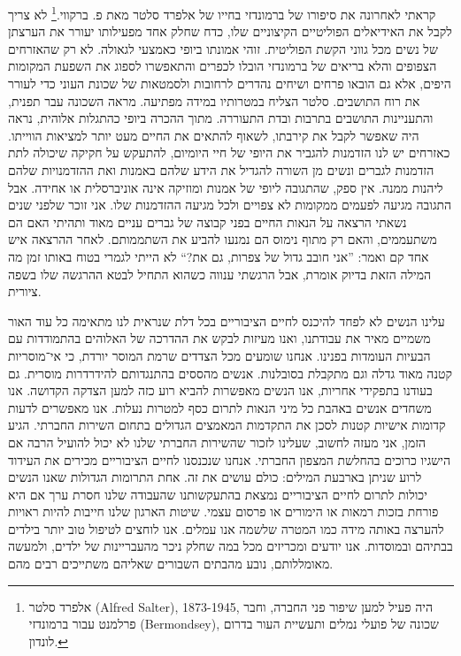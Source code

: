 \documentclass[12pt, extrafontsizes, twopage, a5paper]{memoir}
\begin{document}
קראתי לאחרונה את סיפורו של ברמונדזי בחייו של אלפרד סלטר מאת פ. ברקווי.\footnote{אלפרד סלטר (\textenglish{Alfred Salter}), 1873-1945, היה פעיל למען שיפור פני החברה, וחבר פרלמנט עבור ברמונדזי (\textenglish{Bermondsey}), שכונה של פועלי נמלים ותעשיית העור בדרום לונדון.} לא צריך לקבל את האידיאלים הפוליטיים הקיצוניים שלו, כדח שחלק אחד מפעילותו יעורר את הערצתן של נשים מכל גווני הקשת הפוליטית. זוהי אמונתו ביופי כאמצעי לגאולה. לא רק שהאזרחים הצפופים והלא בריאים של ברמונדזי הובלו לכפרים והתאפשרו לספוג את השפעת המקומות היפים, אלא גם הובאו פרחים ושיחים נהדרים לרחובות ולסמטאות של שכונת העוני כדי לעורר את רוח התושבים. סלטר הצליח במטרותיו במידה מפתיעה. מראה השכונה עבר תפנית, והתעניינות התושבים בתרבות ובדת התעוררה. מתוך ההכרה ביופי כהתגלות אלוהית, נראה היה שאפשר לקבל את קירבתו, לשאוף להתאים את החיים מעט יותר למציאות הווייתו. כאזרחים יש לנו הזדמנות להגביר את היופי של חיי היומיום, להתעקש על חקיקה שיכולה לתת הזדמנות לגברים ונשים מן השורה להגדיל את הידע שלהם באמנות ואת ההזדמנויות שלהם ליהנות ממנה. אין ספק, שהתגובה ליופי של אמנות ומוזיקה אינה אוניברסלית או אחידה. אבל התגובה מגיעה לפעמים ממקומות לא צפויים ולכל מגיעה ההזדמנות שלו. אני זוכר שלפני שנים נשאתי הרצאה על הנאות החיים בפני קבוצה של גברים עניים מאוד ותהיתי האם הם משתעממים, והאם רק מתוף נימוס הם נמנעו להביע את השתממותם. לאחר ההרצאה איש אחד קם ואמר: ”אני חובב גדול של צפרות, גם את?“ לא הייתי לגמרי בטוח באותו זמן מה המילה הזאת בדיוק אומרת, אבל הרגשתי ענווה כשהוא התחיל לבטא ההרגשה שלו בשפה ציורית.

עלינו הנשים לא לפחד להיכנס לחיים הציבוריים בכל דלת שנראית לנו מתאימה כל עוד האור משמיים מאיר את עבודתנו, ואנו מעיזות לבקש את ההדרכה של האלוהים בהתמודדות עם הבעיות העומדות בפנינו. אנחנו שומעים מכל הצדדים שרמת המוסר יורדת, כי אי־מוסריות קטנה מאוד גדלה וגם מתקבלת בסובלנות. אנשים מהססים בהתנגדותם להידרדרות מוסרית. גם בעודנו בתפקידי אחריות, אנו הנשים מאפשרות להביא רוע כזה למען הצדקה הקדושה. אנו משחדים אנשים באהבת כל מיני הנאות לתרום כסף למטרות נעלות. אנו מאפשרים לדעות קדומות אישיות קטנות לסכן את התקדמות המאמצים הגדולים בתחום השירות החברתי. הגיע הזמן, אני מעזה לחשוב, שעלינו לזכור שהשירות החברתי שלנו לא יכול להועיל הרבה אם הישגיו כרוכים בהחלשת המצפון החברתי. אנחנו שנכנסנו לחיים הציבוריים מכירים את העידוד לרוע שניתן בארבעת המילים: כולם עושים את זה. אחת התרומות הגדולות שאנו הנשים יכולות לתרום לחיים הציבוריים נמצאת בהתעקשותנו שהעבודה שלנו חסרת ערך אם היא פורחת בזכות רמאות או הימורים או פרסום עצמי. שיטות הארגון שלנו חייבות להיות ראויות להערצה באותה מידה כמו המטרה שלשמה אנו עמלים. אנו לוחצים לטיפול טוב יותר בילדים בבתיהם ובמוסדות. אנו יודעים ומכריזים מכל במה שחלק ניכר מהעבריינות של ילדים, ולמעשה מאומללותם, נובע מהבתים השבורים שאליהם משתייכים רבים מהם.
\end{document}
